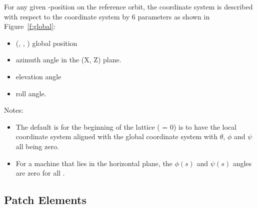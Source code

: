 \documentclass{hitec}     %
\begin{document}
{For any given -position on the reference orbit, the  coordinate system is described with
respect to the  coordinate system by 6 parameters as shown in Figure~\ref{f:global}:
\vspace{-5 pt}
\begin{itemize}
\item (, , ) global position
\item \vn{$\theta$} azimuth angle in the (X, Z) plane.
\item \vn{$\phi$} elevation angle
\item \vn{$\psi$} roll angle.
\end{itemize}

Notes:
\vspace{-5 pt}
\begin{itemize}
\item 
The default is for the beginning of the lattice ( = 0) is to have the local 
coordinate system aligned with the global  coordinate system with $\theta$, $\phi$ and
$\psi$ all being zero.
\item 
For a machine that lies in the horizontal plane, the $\phi(s)$ and $\psi(s)$ angles are zero for all
.
\end{itemize}

\subsection{Patch Elements}
\label{s:patch}

}
\end{document}
